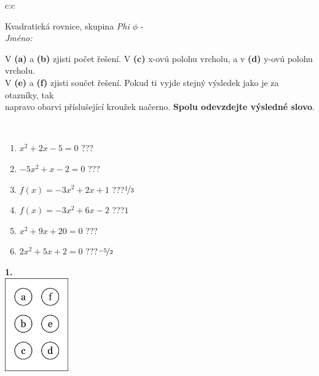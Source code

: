 \documentclass[10pt]{report}
\begin{document}
\begin{tabular}{c:c}
\begin{minipage}[c][104.5mm][t]{0.5\linewidth}
\begin{center}
\vspace{7mm}
{\huge Kvadratická rovnice, skupina \textit{Phi $\phi$} -}\\[5mm]
\textit{Jméno:}\phantom{xxxxxxxxxxxxxxxxxxxxxxxxxxxxxxxxxxxxxxxxxxxxxxxxxxxxxxxxxxxxxxxxx}\\[5mm]
\begin{minipage}{0.95\linewidth}
\begin{center}
V \textbf{(a)} a \textbf{(b)} zjisti počet řešení. V \textbf{(c)} x-ovú polohu vrcholu, a v \textbf{(d)} y-ovú polohu vrcholu.\\V \textbf{(e)} a \textbf{(f)} zjisti součet řešení. Pokud ti vyjde stejný výsledek jako je za otazníky, tak\\napravo obarvi příslušející kroužek načerno. \textbf{Spolu odevzdejte výsledné slovo}.
\end{center}
\end{minipage}
\\[1mm]
\begin{minipage}{0.79\linewidth}
\begin{center}
\begin{varwidth}{\linewidth}
\begin{enumerate}
\Large
\item $x^2+2x-5=0$\quad \dotfill\; ???\;\dotfill {}
\item $-5x^2+x-2=0$\quad \dotfill\; ???\;\dotfill {}
\item $f(x)=-3x^2+2x+1$\quad \dotfill\; ???\;\dotfill \quad $\nicefrac{1}{3}$
\item $f(x)=-3x^2+6x-2$\quad \dotfill\; ???\;\dotfill \quad $1$
\item $x^2+9x+20=0$\quad \dotfill\; ???\;\dotfill {}
\item $2x^2+5x+2=0$\quad \dotfill\; ???\;\dotfill \quad $\nicefrac{-5}{2}$
\end{enumerate}
\end{varwidth}
\end{center}
\end{minipage}
\begin{minipage}{0.20\linewidth}
\begin{center}
{\Huge\bfseries 1.} \\[2mm]
\includegraphics[height=40mm]{../images/braille.png}

\end{center}
\end{minipage}
\end{center}
\end{minipage}
\end{tabular}
\end{document}
